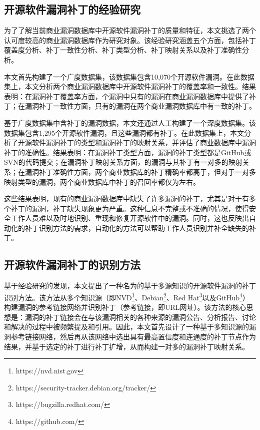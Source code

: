 \subsection{开源软件漏洞补丁的经验研究}
为了了解当前商业漏洞数据库中开源软件漏洞补丁的质量和特征，本文挑选了两个认可度较高的商业漏洞数据库作为研究对象。该经验研究涵盖五个方面，包括补丁覆盖度分析、补丁一致性分析、补丁类型分析、补丁映射关系以及补丁准确性分析。

本文首先构建了一个广度数据集，该数据集包含10,070个开源软件漏洞。在此数据集上，本文分析两个商业漏洞数据库中开源软件漏洞补丁的覆盖率和一致性。结果表明：在漏洞补丁覆盖率方面，个漏洞中只有的漏洞在商业漏洞数据库中提供了补丁；在漏洞补丁一致性方面，只有的漏洞在两个商业漏洞数据库中有一致的补丁。%

基于广度数据集中含补丁的漏洞数据，本文还通过人工构建了一个深度数据集。该数据集包含1,295个开源软件漏洞，且这些漏洞都有补丁。在此数据集上，本文分析了开源软件漏洞补丁的类型和漏洞补丁的映射关系，并评估了商业数据库中漏洞补丁的准确性。结果表明：在漏洞补丁类型方面，漏洞的补丁类型都是GitHub或SVN的代码提交；在漏洞补丁映射关系方面，的漏洞与其补丁有一对多的映射关系；在漏洞补丁准确性方面，两个商业数据库的补丁精确率都高于，但对于一对多映射类型的漏洞，两个商业数据库中补丁的召回率都仅为左右。

这些结果表明，现有的商业漏洞数据库中缺失了许多漏洞的补丁，尤其是对于有多个补丁的漏洞，补丁缺失现象更为严重。这种信息不完整或不准确的情况，使得安全工作人员难以及时地识别、重现和修复开源软件中的漏洞。同时，这也反映出自动化的补丁识别方法的需求，自动化的方法可以帮助工作人员识别并补全缺失的补丁。

\subsection{开源软件漏洞补丁的识别方法}
基于经验研究的发现，本文提出了一种名为\tool 的基于多源知识的开源软件漏洞的补丁识别方法。该方法从多个知识源（即NVD\footnote{https://nvd.nist.gov}、Debian\footnote{https://security-tracker.debian.org/tracker/}、Red Hat\footnote{https://bugzilla.redhat.com/}以及GitHub\footnote{https://github.com/}）构建漏洞的参考链接网络并识别补丁（参考链接，即URL网址）。该方法的核心思想是：漏洞的补丁链接会在与该漏洞相关的各种来源的漏洞公告、分析报告、讨论和解决的过程中被频繁提及和引用。因此，本文首先设计了一种基于多知识源的漏洞参考链接网络，然后再从该网络中选出具有最高置信度和连通度的补丁节点作为结果，并基于选定的补丁进行补丁扩增，从而构建一对多的漏洞补丁映射关系。

